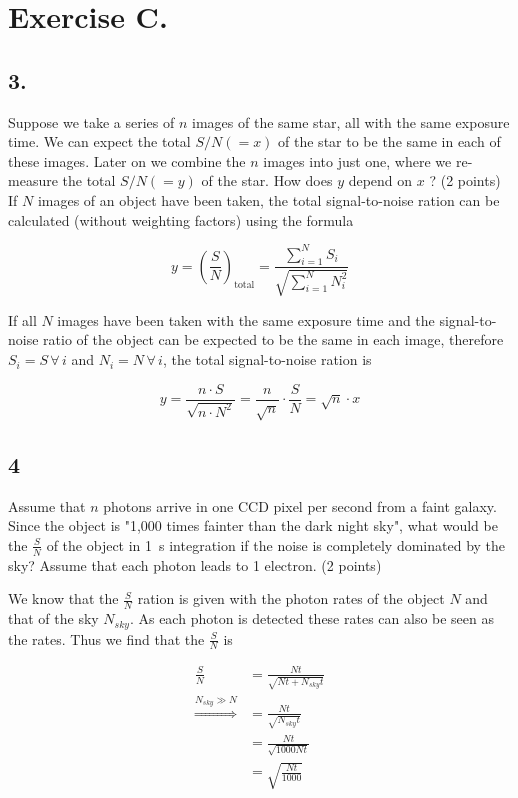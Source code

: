 \documentclass[11pt,a4paper,twoside]{article}
\newcommand{\electron}{\ce{e^-}}
\newcommand{\SNR}{\ensuremath{\frac{S}{N}} }
\begin{document}
\section*{Exercise C.}

\subsection*{3.}  Suppose we take a series of $n$ images of the same star, all with the same exposure time. We can expect the total $S/N (= x)$ of the star to be the same in each of these images. Later on we combine the $n$ images into just one, where we re-measure the total $S/N (= y)$ of the star. How does $y$ depend on $x$ ? (2 points) \\

If $N$ images of an object have been taken, the total signal-to-noise ration can be calculated (without weighting factors) using the formula

\begin{equation}
 y = \left( \frac{S}{N} \right)_{\text{total}} = \frac{\sum_{i=1}^N S_i}{\sqrt{\sum_{i=1}^N N_i^2}}
\end{equation}

If all $N$ images have been taken with the same exposure time and the signal-to-noise ratio of the object can be expected to be the same in each image, therefore $S_i = S \, \forall \, i$ and $N_i = N \, \forall \, i$, the total signal-to-noise ration is 

\begin{equation}
 y = \frac{n \cdot S}{\sqrt{n \cdot N^2}} = \frac{n}{\sqrt{n}} \cdot \frac{S}{N} = \sqrt{n} \cdot x
\end{equation}

\subsection*{4}
 Assume that $n$ photons arrive in one CCD pixel per second from a faint galaxy.
Since the object is "1,000 times fainter than the dark night sky", what would 
be the \SNR of the object in \SI{1}{\second} integration if the noise 
is completely dominated by the sky? Assume that each photon leads to 1 electron. 
(2 points)

We know that the \SNR ration is given with the photon rates of the object $N$
and that of the sky $N_{sky}$. As each photon is detected these rates can also
be seen as the \electron rates. Thus we find that the \SNR is

\begin{align}
    \frac{S}{N} &=  \frac{Nt}{\sqrt{Nt + N_{sky}t}} \\
    \overset{N_{sky}\gg N}{\Rightarrow} &=\frac{Nt}{\sqrt{N_{sky}t}} \\
    &= \frac{Nt}{\sqrt{1000Nt}} \\
    &= \sqrt{\frac{Nt}{1000}} \\
\end{align}
\end{document}
